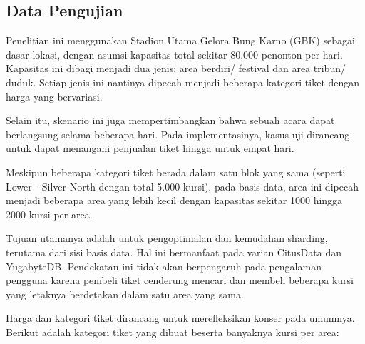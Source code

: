 \subsection{Data Pengujian}

Penelitian ini menggunakan Stadion Utama Gelora Bung Karno (GBK) sebagai dasar lokasi, dengan asumsi kapasitas total sekitar 80.000 penonton per hari. Kapasitas ini dibagi menjadi dua jenis: area berdiri/ festival dan area tribun/ duduk. Setiap jenis ini nantinya dipecah menjadi beberapa kategori tiket dengan harga yang bervariasi.

Selain itu, skenario ini juga mempertimbangkan bahwa sebuah acara dapat berlangsung selama beberapa hari. Pada implementasinya, kasus uji dirancang untuk dapat menangani penjualan tiket hingga untuk empat hari.

Meskipun beberapa kategori tiket berada dalam satu blok yang sama (seperti Lower - Silver North dengan total 5.000 kursi), pada basis data, area ini dipecah menjadi beberapa area yang lebih kecil dengan kapasitas sekitar 1000 hingga 2000 kursi per area.

Tujuan utamanya adalah untuk pengoptimalan dan kemudahan sharding, terutama dari sisi basis data. Hal ini bermanfaat pada varian CitusData dan YugabyteDB. Pendekatan ini tidak akan berpengaruh pada pengalaman pengguna karena pembeli tiket cenderung mencari dan membeli beberapa kursi yang letaknya berdetakan dalam satu area yang sama.

Harga dan kategori tiket dirancang untuk merefleksikan konser pada umumnya. Berikut adalah kategori tiket yang dibuat beserta banyaknya kursi per area:

